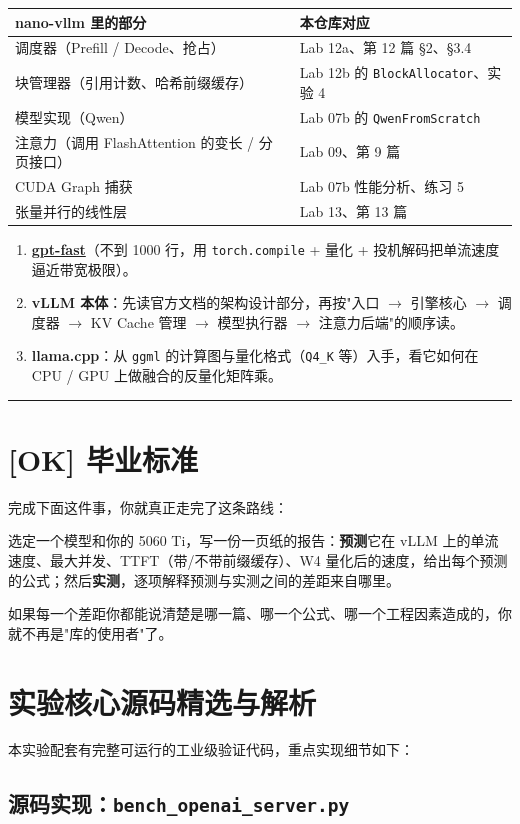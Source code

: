 \begin{center}
\small
\begin{tabularx}{\textwidth}{p{3.5cm} X}
\toprule
\textbf{nano-vllm 里的部分} & \textbf{本仓库对应} \\
\midrule
调度器（Prefill / Decode、抢占） & Lab 12a、第 12 篇 §2、§3.4 \\
块管理器（引用计数、哈希前缀缓存） & Lab 12b 的 \texttt{BlockAllocator}、实验 4 \\
模型实现（Qwen） & Lab 07b 的 \texttt{QwenFromScratch} \\
注意力（调用 FlashAttention 的变长 / 分页接口） & Lab 09、第 9 篇 \\
CUDA Graph 捕获 & Lab 07b 性能分析、练习 5 \\
张量并行的线性层 & Lab 13、第 13 篇 \\
\bottomrule
\end{tabularx}
\end{center}

\begin{enumerate}
  \item \textbf{\href{https://github.com/pytorch-labs/gpt-fast}{gpt-fast}}（不到 1000 行，用 \texttt{torch.compile} + 量化 + 投机解码把单流速度逼近带宽极限）。
  \item \textbf{vLLM 本体}：先读官方文档的架构设计部分，再按"入口 $\rightarrow$ 引擎核心 $\rightarrow$ 调度器 $\rightarrow$ KV Cache 管理 $\rightarrow$ 模型执行器 $\rightarrow$ 注意力后端"的顺序读。
  \item \textbf{llama.cpp}：从 \texttt{ggml} 的计算图与量化格式（\texttt{Q4\_K} 等）入手，看它如何在 CPU / GPU 上做融合的反量化矩阵乘。
\end{enumerate}

\vspace{0.8em}\hrule\vspace{0.8em}

\section{[OK] 毕业标准}

完成下面这件事，你就真正走完了这条路线：

\begin{mathBox}[核心数学定理推导]
选定一个模型和你的 5060 Ti，写一份一页纸的报告：\textbf{预测}它在 vLLM 上的单流速度、最大并发、TTFT（带/不带前缀缓存）、W4 量化后的速度，给出每个预测的公式；然后\textbf{实测}，逐项解释预测与实测之间的差距来自哪里。
\end{mathBox}

如果每一个差距你都能说清楚是哪一篇、哪一个公式、哪一个工程因素造成的，你就不再是"库的使用者"了。


\section{实验核心源码精选与解析}

本实验配套有完整可运行的工业级验证代码，重点实现细节如下：


\subsection{源码实现：\texttt{bench\_openai\_server.py}}



